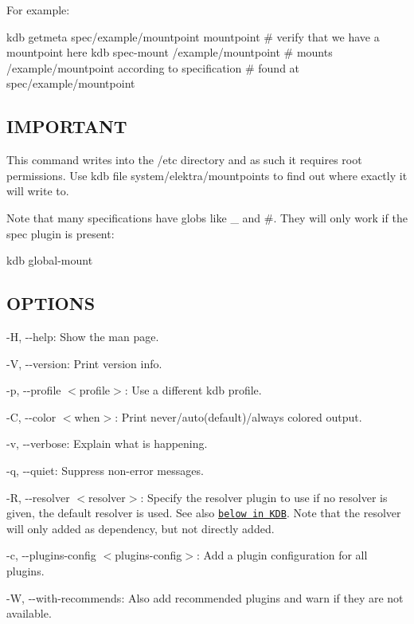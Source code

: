 For example\+: \begin{DoxyVerb}    kdb getmeta spec/example/mountpoint mountpoint  # verify that we have a mountpoint here
    kdb spec-mount /example/mountpoint  # mounts /example/mountpoint according to specification
            # found at spec/example/mountpoint
\end{DoxyVerb}


\subsection*{I\+M\+P\+O\+R\+T\+A\+NT}

This command writes into the {\ttfamily /etc} directory and as such it requires root permissions. Use {\ttfamily kdb file system/elektra/mountpoints} to find out where exactly it will write to.

Note that many specifications have globs like {\ttfamily \+\_\+} and {\ttfamily \#}. They will only work if the {\ttfamily spec} plugin is present\+: \begin{DoxyVerb}    kdb global-mount
\end{DoxyVerb}


\subsection*{O\+P\+T\+I\+O\+NS}


\begin{DoxyItemize}
\item {\ttfamily -\/H}, {\ttfamily -\/-\/help}\+: Show the man page.
\item {\ttfamily -\/V}, {\ttfamily -\/-\/version}\+: Print version info.
\item {\ttfamily -\/p}, {\ttfamily -\/-\/profile $<$profile$>$}\+: Use a different kdb profile.
\item {\ttfamily -\/C}, {\ttfamily -\/-\/color $<$when$>$}\+: Print never/auto(default)/always colored output.
\item {\ttfamily -\/v}, {\ttfamily -\/-\/verbose}\+: Explain what is happening.
\item {\ttfamily -\/q}, {\ttfamily -\/-\/quiet}\+: Suppress non-\/error messages.
\item {\ttfamily -\/R}, {\ttfamily -\/-\/resolver $<$resolver$>$}\+: Specify the resolver plugin to use if no resolver is given, the default resolver is used. See also \href{#KDB}{\tt below in K\+DB}. Note that the resolver will only added as dependency, but not directly added.
\item {\ttfamily -\/c}, {\ttfamily -\/-\/plugins-\/config $<$plugins-\/config$>$}\+: Add a plugin configuration for all plugins.
\item {\ttfamily -\/W}, {\ttfamily -\/-\/with-\/recommends}\+: Also add recommended plugins and warn if they are not available.
\end{DoxyItemize}

